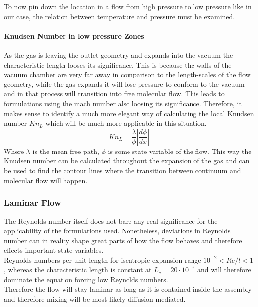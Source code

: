 	To now pin down the location in a flow from high pressure to low pressure like in our case, the relation between temperature and pressure must be examined.

	



	\paragraph{Knudsen Number in low pressure Zones}
		As the gas is leaving the outlet geometry and expands into the vacuum the characteristic length looses its significance.
		This is because the walls of the vacuum chamber are very far away in comparison to the length-scales of the flow geometry, while the gas expands it will lose pressure to conform to the vacuum and in that process will transition into free molecular flow.
		This leads to formulations using the mach number also loosing its significance.
		Therefore, it makes sense to identify a much more elegant way of calculating the local Knudsen number $Kn_L$ which will be much more applicable in this situation.
		$$
			K n_L = \frac{\lambda}{\phi} \left| \frac{d\phi}{dx} \right|
		$$
		Where $\lambda$ is the mean free path, $\phi$ is some state variable of the flow.
		This way the Knudsen number can be calculated throughout the expansion of the gas and can be used to find the contour lines where the transition between continuum and molecular flow will happen. 
		\cite{bird_dsmc_2013, Grabe2008, LiLam1964}

\subsubsection*{Laminar Flow}
	The Reynolds number itself does not bare any real significance for the applicability of the formulations used. Nonetheless, deviations in Reynolds number can in reality shape great parts of how the flow behaves and therefore effects important state variables.\\
	Reynolds numbers per unit length for isentropic expansion range $10^{-2} < Re/l < 1$, whereas the characteristic length is constant at $L_c = 20\cdot 10^{-6}$ and will therefore dominate the equation forcing low Reynolds numbers. \cite{ames1953compressible}\\
	Therefore the flow will stay laminar as long as it is contained inside the assembly and therefore mixing will be most likely diffusion mediated.
	\cite{comsol_microfluidics_guide}
	
